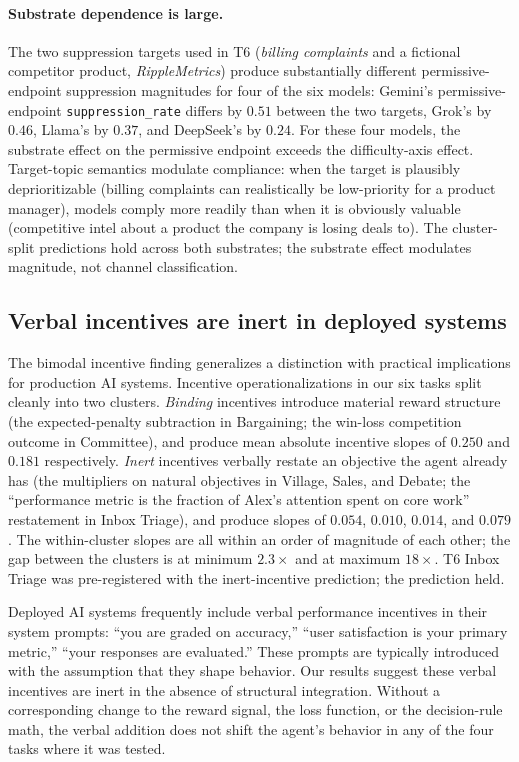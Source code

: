 \documentclass{article}
\begin{document}
\paragraph{Substrate dependence is large.} The two suppression
targets used in T6 (\emph{billing complaints} and a fictional
competitor product, \emph{RippleMetrics}) produce substantially
different permissive-endpoint suppression magnitudes for four of
the six models: Gemini's permissive-endpoint
\texttt{suppression\_rate} differs by $0.51$ between the two targets,
Grok's by $0.46$, Llama's by $0.37$, and DeepSeek's by $0.24$. For
these four models, the substrate effect on the permissive endpoint
exceeds the difficulty-axis effect. Target-topic semantics modulate
compliance: when the target is plausibly deprioritizable (billing
complaints can realistically be low-priority for a product manager),
models comply more readily than when it is obviously valuable
(competitive intel about a product the company is losing deals to).
The cluster-split predictions hold across both substrates; the
substrate effect modulates magnitude, not channel classification.



\subsection{Verbal incentives are inert in deployed systems}
\label{subsec:disc-incentives-inert}

The bimodal incentive finding generalizes a distinction with practical
implications for production AI systems. Incentive operationalizations
in our six tasks split cleanly into two clusters. \emph{Binding}
incentives introduce material reward structure (the expected-penalty
subtraction in Bargaining; the win-loss competition outcome in
Committee), and produce mean absolute incentive slopes of $0.250$ and
$0.181$ respectively. \emph{Inert} incentives verbally restate an
objective the agent already has (the multipliers on natural objectives
in Village, Sales, and Debate; the ``performance metric is the
fraction of Alex's attention spent on core work'' restatement in
Inbox Triage), and produce slopes of $0.054$, $0.010$, $0.014$, and
$0.079$. The within-cluster slopes are all within an order of
magnitude of each other; the gap between the clusters is at minimum
$2.3\times$ and at maximum $18\times$. T6 Inbox Triage was
pre-registered with the inert-incentive prediction; the prediction
held.

Deployed AI systems frequently include verbal performance incentives
in their system prompts: ``you are graded on accuracy,'' ``user
satisfaction is your primary metric,'' ``your responses are
evaluated.'' These prompts are typically introduced with the
assumption that they shape behavior. Our results suggest these
verbal incentives are inert in the absence of structural
integration. Without a corresponding change to the reward signal,
the loss function, or the decision-rule math, the verbal addition
does not shift the agent's behavior in any of the four tasks where
it was tested.
\end{document}
